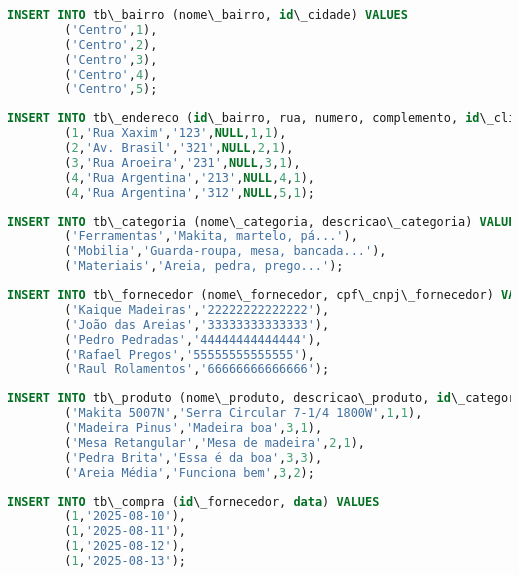 \documentclass[
12pt,
a4paper,
semrecuonosumario,
sumario = abnt-6027-2012]{report}
\begin{document}
    \begin{lstlisting}[language=SQL,caption={DML -- Tabela \texttt{tb\_bairro}}]
        INSERT INTO tb\_bairro (nome\_bairro, id\_cidade) VALUES
        ('Centro',1),
        ('Centro',2),
        ('Centro',3),
        ('Centro',4),
        ('Centro',5);
    \end{lstlisting}
    
    \begin{lstlisting}[language=SQL,caption={DML -- Tabela \texttt{tb\_endereco}}]
        INSERT INTO tb\_endereco (id\_bairro, rua, numero, complemento, id\_cliente, prioridade) VALUES
        (1,'Rua Xaxim','123',NULL,1,1),
        (2,'Av. Brasil','321',NULL,2,1),
        (3,'Rua Aroeira','231',NULL,3,1),
        (4,'Rua Argentina','213',NULL,4,1),
        (4,'Rua Argentina','312',NULL,5,1);
    \end{lstlisting}
    
    \begin{lstlisting}[language=SQL,caption={DML -- Tabela \texttt{tb\_categoria}}]
        INSERT INTO tb\_categoria (nome\_categoria, descricao\_categoria) VALUES
        ('Ferramentas','Makita, martelo, pá...'),
        ('Mobilia','Guarda-roupa, mesa, bancada...'),
        ('Materiais','Areia, pedra, prego...');
    \end{lstlisting}
    
    \begin{lstlisting}[language=SQL,caption={DML -- Tabela \texttt{tb\_fornecedor}}]
        INSERT INTO tb\_fornecedor (nome\_fornecedor, cpf\_cnpj\_fornecedor) VALUES
        ('Kaique Madeiras','22222222222222'),
        ('João das Areias','33333333333333'),
        ('Pedro Pedradas','44444444444444'),
        ('Rafael Pregos','55555555555555'),
        ('Raul Rolamentos','66666666666666');
    \end{lstlisting}
    
    \begin{lstlisting}[language=SQL,caption={DML -- Tabela \texttt{tb\_produto}}]
        INSERT INTO tb\_produto (nome\_produto, descricao\_produto, id\_categoria, id\_fornecedor) VALUES
        ('Makita 5007N','Serra Circular 7-1/4 1800W',1,1),
        ('Madeira Pinus','Madeira boa',3,1),
        ('Mesa Retangular','Mesa de madeira',2,1),
        ('Pedra Brita','Essa é da boa',3,3),
        ('Areia Média','Funciona bem',3,2);
    \end{lstlisting}
    
    \begin{lstlisting}[language=SQL,caption={DML -- Tabela \texttt{tb\_compra}}]
        INSERT INTO tb\_compra (id\_fornecedor, data) VALUES
        (1,'2025-08-10'),
        (1,'2025-08-11'),
        (1,'2025-08-12'),
        (1,'2025-08-13');
    \end{lstlisting}
    
\end{document}
